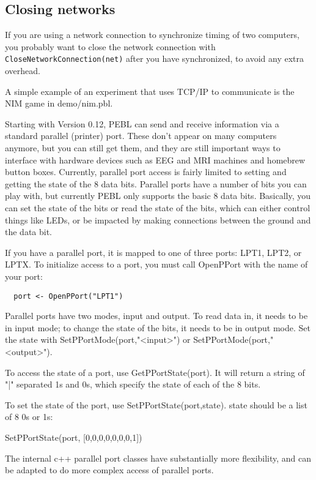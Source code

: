 \subsection{Closing networks}
If you are using a network connection to synchronize timing of two
computers, you probably want to close the network connection with\\
\texttt{CloseNetworkConnection(net)} after you have synchronized, to
avoid any extra overhead.

A simple example of an experiment that uses TCP/IP to communicate is
the NIM game in  demo/nim.pbl.



Starting with Version 0.12, PEBL can send and receive information via a standard parallel (printer) port.    These don't appear on many computers anymore, but you can still get them, and they are still important ways to interface with hardware devices such as EEG and MRI machines and homebrew button boxes.  Currently, parallel port access is fairly limited to setting and getting the state of the 8 data bits.  Parallel ports have a number of bits you can play with, but currently PEBL only supports the basic 8 data bits.  Basically, you can set the state of the bits or read the state of the bits, which can either control things like LEDs, or be impacted by making connections between the ground and the data bit.


If you have a parallel port, it is mapped to one of three ports: LPT1, LPT2, or LPTX.  To initialize access to a port, you must call OpenPPort with the name of your port:
\begin{verbatim}
  port <- OpenPPort("LPT1")
\end{verbatim}

Parallel ports have two modes, input and output.  To read data in, it needs to be in input mode; to change the state of the bits, it needs to be in output mode.  Set the state with SetPPortMode(port,"<input>") or SetPPortMode(port,"<output>").

To access the state of a port, use GetPPortState(port).  It will return a string of "|" separated 1s and 0s, which specify the state of each of the 8 bits.

To set the state of the port, use SetPPortState(port,state).  state should be a list of 8 0s or 1s:

SetPPortState(port, [0,0,0,0,0,0,0,1])

The internal c++ parallel port classes have substantially more flexibility, and can be adapted to do more complex access of parallel ports.





